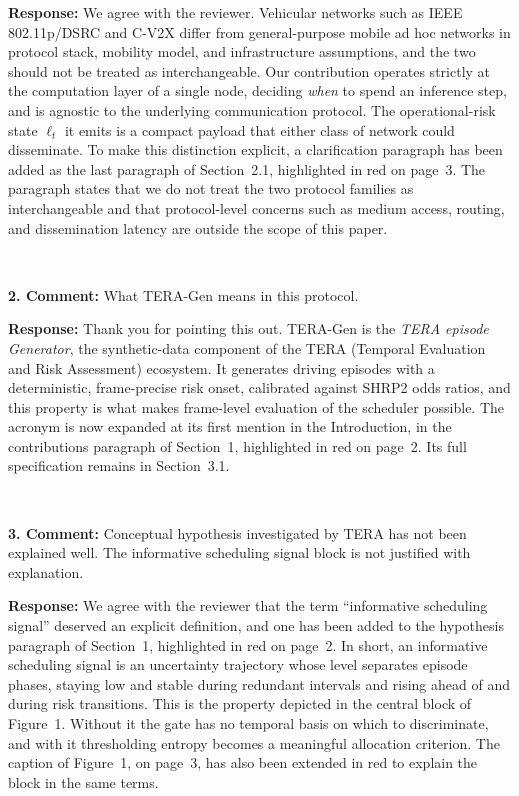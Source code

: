 \documentclass[1p,12pt,authoryear]{elsarticle}
\begin{document}
\vspace{2mm}
\noindent \textbf{Response:} We agree with the reviewer. Vehicular networks such as IEEE 802.11p/DSRC and C-V2X differ from general-purpose mobile ad hoc networks in protocol stack, mobility model, and infrastructure assumptions, and the two should not be treated as interchangeable. Our contribution operates strictly at the computation layer of a single node, deciding \emph{when} to spend an inference step, and is agnostic to the underlying communication protocol. The operational-risk state $\ell_t$ it emits is a compact payload that either class of network could disseminate. To make this distinction explicit, a clarification paragraph has been added as the last paragraph of Section~2.1, highlighted in red on page~3. The paragraph states that we do not treat the two protocol families as interchangeable and that protocol-level concerns such as medium access, routing, and dissemination latency are outside the scope of this paper.

~

\noindent \textbf{2. Comment:} What TERA-Gen means in this protocol.

\vspace{2mm}
\noindent \textbf{Response:} Thank you for pointing this out. TERA-Gen is the \emph{TERA episode Generator}, the synthetic-data component of the TERA (Temporal Evaluation and Risk Assessment) ecosystem. It generates driving episodes with a deterministic, frame-precise risk onset, calibrated against SHRP2 odds ratios, and this property is what makes frame-level evaluation of the scheduler possible. The acronym is now expanded at its first mention in the Introduction, in the contributions paragraph of Section~1, highlighted in red on page~2. Its full specification remains in Section~3.1.

~

\noindent \textbf{3. Comment:} Conceptual hypothesis investigated by TERA has not been explained well. The informative scheduling signal block is not justified with explanation.

\vspace{2mm}
\noindent \textbf{Response:} We agree with the reviewer that the term ``informative scheduling signal'' deserved an explicit definition, and one has been added to the hypothesis paragraph of Section~1, highlighted in red on page~2. In short, an informative scheduling signal is an uncertainty trajectory whose level separates episode phases, staying low and stable during redundant intervals and rising ahead of and during risk transitions. This is the property depicted in the central block of Figure~1. Without it the gate has no temporal basis on which to discriminate, and with it thresholding entropy becomes a meaningful allocation criterion. The caption of Figure~1, on page~3, has also been extended in red to explain the block in the same terms.
\end{document}
